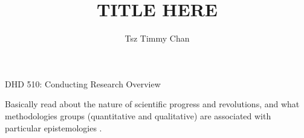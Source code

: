 \documentclass{TC}
\title{TITLE HERE}	%
\author{Tsz Timmy Chan}	%
\begin{document}
DHD 510: Conducting Research Overview

Basically read about the nature of scientific progress and revolutions, and what methodologies groups (quantitative and qualitative) are associated with particular epistemologies \parencite{titchkosky_introduction_2007, kuhn_progress_1996, sprague_field_2005, hahn_political_1993}. 
\end{document}
